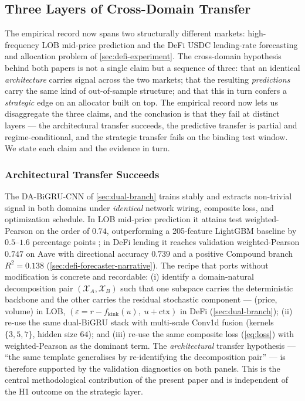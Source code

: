 \subsection{Three Layers of Cross-Domain Transfer}
\label{sec:disc-three-layers}

The empirical record now spans two structurally different markets:
high-frequency LOB mid-price prediction \cite{solovev2026lob} and
the DeFi USDC lending-rate forecasting and allocation problem of
\cref{sec:defi-experiment}. The cross-domain hypothesis behind both
papers is not a single claim but a sequence of three: that an
identical \emph{architecture} carries signal across the two markets;
that the resulting \emph{predictions} carry the same kind of
out-of-sample structure; and that this in turn confers a
\emph{strategic} edge on an allocator built on top. The empirical
record now lets us disaggregate the three claims, and the conclusion
is that they fail at distinct layers --- the architectural transfer
succeeds, the predictive transfer is partial and regime-conditional,
and the strategic transfer fails on the binding test window. We
state each claim and the evidence in turn.

\subsubsection{Architectural Transfer Succeeds}
\label{sec:disc-arch}

The DA-BiGRU-CNN of \cref{sec:dual-branch} trains stably and
extracts non-trivial signal in both domains under \emph{identical}
network wiring, composite loss, and optimization schedule. In LOB
mid-price prediction it attains test weighted-Pearson on the order
of $0.74$, outperforming a 205-feature LightGBM baseline by
$0.5$--$1.6$ percentage points
\cite{solovev2026lob}; in DeFi lending it reaches validation
weighted-Pearson $0.747$ on Aave with directional accuracy $0.739$
and a positive Compound branch $R^{2}=0.138$
(\cref{sec:defi-forecaster-narrative}). The recipe that ports
without modification is concrete and recordable: (i) identify a
domain-natural decomposition pair $(\mathcal X_A, \mathcal X_B)$
such that one subspace carries the deterministic backbone and the
other carries the residual stochastic component --- (price, volume)
in LOB, $(\varepsilon = r-f_{\text{kink}}(u),\; u+\text{ctx})$ in
DeFi (\cref{sec:dual-branch}); (ii) re-use the same dual-BiGRU
stack with multi-scale Conv1d fusion (kernels $\{3,5,7\}$, hidden
size $64$); and (iii) re-use the same composite loss
(\cref{eq:loss}) with weighted-Pearson as the dominant term. The
\emph{architectural} transfer hypothesis --- ``the same template
generalises by re-identifying the decomposition pair'' --- is
therefore supported by the validation diagnostics on both panels.
This is the central methodological contribution of the present
paper and is independent of the H1 outcome on the strategic layer.

